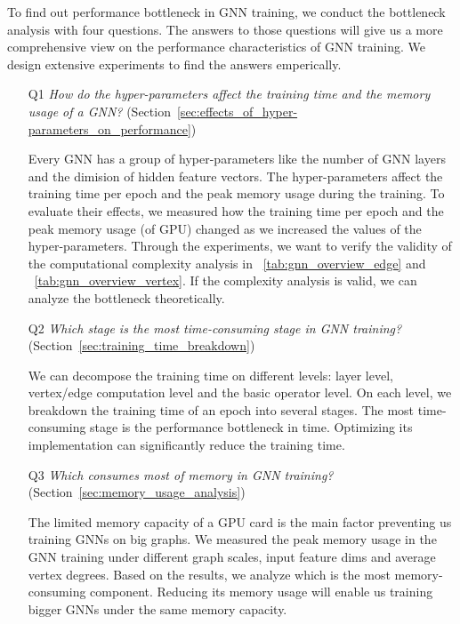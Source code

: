 To find out performance bottleneck in GNN training, we conduct the bottleneck analysis with four questions.
The answers to those questions will give us a more comprehensive view on the performance characteristics of GNN training.
We design extensive experiments to find the answers emperically.
\begin{itemize}
	
	\item[Q1] \emph{How do the hyper-parameters affect the training time and the memory usage of a GNN?} (Section~\ref{sec:effects_of_hyper-parameters_on_performance})
	
			Every GNN has a group of hyper-parameters like the number of GNN layers and the dimision of hidden feature vectors. The hyper-parameters affect the training time per epoch and the peak memory usage during the training.
			To evaluate their effects, we measured how the training time per epoch and the peak memory usage (of GPU) changed as we increased the values of the hyper-parameters.
			Through the experiments, we want to verify the validity of the computational complexity analysis in \tablename~\ref{tab:gnn_overview_edge} and \tablename~\ref{tab:gnn_overview_vertex}.
			If the complexity analysis is valid, we can analyze the bottleneck theoretically.

	\item[Q2] \emph{Which stage is the most time-consuming stage in GNN training?} (Section~\ref{sec:training_time_breakdown})
	
			We can decompose the training time on different levels: layer level, vertex/edge computation level and the basic operator level.
			On each level, we breakdown the training time of an epoch into several stages. The most time-consuming stage is the performance bottleneck in time.
			Optimizing its implementation can significantly reduce the training time.
			
	\item[Q3] \emph{Which consumes most of memory in GNN training?} (Section~\ref{sec:memory_usage_analysis})
	
			The limited memory capacity of a GPU card is the main factor preventing us training GNNs on big graphs.
			We measured the peak memory usage in the GNN training under different graph scales, input feature dims and average vertex degrees.
			Based on the results, we analyze which is the most memory-consuming component.
			Reducing its memory usage will enable us training bigger GNNs under the same memory capacity.
		

\end{itemize}
